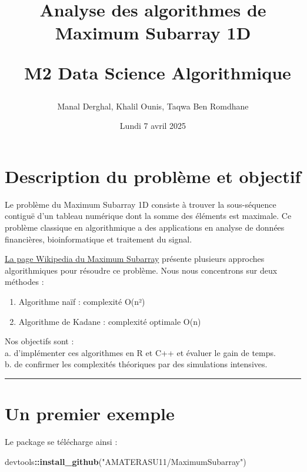 \documentclass[
]{article}
\title{Analyse des algorithmes de Maximum Subarray 1D\\
\strut ~M2 Data Science Algorithmique}
\author{Manal Derghal, Khalil Ounis, Taqwa Ben Romdhane}
\date{Lundi 7 avril 2025}
\newenvironment{Shaded}{\begin{snugshade}}{\end{snugshade}}
\newcommand{\FunctionTok}[1]{\textcolor[rgb]{0.13,0.29,0.53}{\textbf{#1}}}
\newcommand{\NormalTok}[1]{#1}
\newcommand{\SpecialCharTok}[1]{\textcolor[rgb]{0.81,0.36,0.00}{\textbf{#1}}}
\newcommand{\StringTok}[1]{\textcolor[rgb]{0.31,0.60,0.02}{#1}}
\providecommand{\tightlist}{%
  \setlength{\itemsep}{0pt}\setlength{\parskip}{0pt}}
\begin{document}
\maketitle

{
\hypersetup{linkcolor=}
\setcounter{tocdepth}{2}
\tableofcontents
}
\noindent\hrulefill

\section{Description du problème et
objectif}\label{description-du-probluxe8me-et-objectif}

Le problème du Maximum Subarray 1D consiste à trouver la sous-séquence
contiguë d'un tableau numérique dont la somme des éléments est maximale.
Ce problème classique en algorithmique a des applications en analyse de
données financières, bioinformatique et traitement du signal.

\href{https://en.wikipedia.org/wiki/Maximum_subarray_problem}{La page
Wikipedia du Maximum Subarray} présente plusieurs approches
algorithmiques pour résoudre ce problème. Nous nous concentrons sur deux
méthodes :

\begin{enumerate}
\def\labelenumi{\arabic{enumi}.}
\tightlist
\item
  Algorithme naïf : complexité O(n²)
\item
  Algorithme de Kadane : complexité optimale O(n)
\end{enumerate}

Nos objectifs sont :\\
a. d'implémenter ces algorithmes en R et C++ et évaluer le gain de
temps.\\
b. de confirmer les complexités théoriques par des simulations
intensives.

\begin{center}\rule{0.5\linewidth}{0.5pt}\end{center}

\section{Un premier exemple}\label{un-premier-exemple}

Le package se télécharge ainsi :

\begin{Shaded}
\begin{Highlighting}[]
\NormalTok{devtools}\SpecialCharTok{::}\FunctionTok{install\_github}\NormalTok{(}\StringTok{"AMATERASU11/MaximumSubarray"}\NormalTok{)}
\end{Highlighting}
\end{Shaded}
\end{document}
